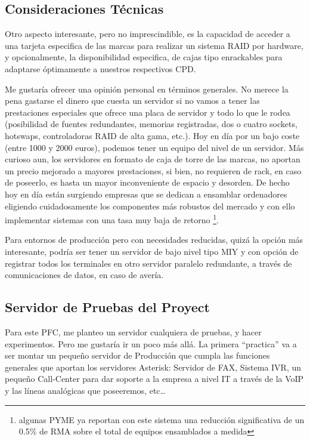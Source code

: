 \subsection{Consideraciones Técnicas}

Otro aspecto interesante, pero no imprescindible, es la capacidad de acceder a una tarjeta especifica de las marcas para realizar un sistema RAID por hardware, y opcionalmente, la disponibilidad especifica, de cajas tipo enrackables para adaptarse óptimamente a nuestros respectivos CPD.

Me gustaría ofrecer una opinión personal en términos generales. No merece la pena gastarse el dinero que cuesta un servidor si no vamos a tener las prestaciones especiales que ofrece una placa de servidor y todo lo que le rodea (posibilidad de fuentes redundantes, memorias registradas, dos o cuatro sockets, hotswaps, controladoras RAID de alta gama, etc.). Hoy en día por un bajo coste (entre 1000 y 2000 euros), podemos tener un equipo del nivel de un servidor. Más curioso aun, los servidores en formato de caja de torre de las marcas, no aportan un precio mejorado a mayores prestaciones, si bien, no requieren de rack, en caso de poseerlo, es hasta un mayor inconveniente de espacio y desorden. De hecho hoy en día están surgiendo empresas que se dedican a ensamblar ordenadores eligiendo cuidadosamente los componentes más robustos del mercado y con ello implementar sistemas con una tasa muy baja de retorno \footnote{algunas PYME ya reportan con este sistema una reducción significativa de un 0.5\% de RMA sobre el total de equipos ensamblados a medida}.

Para entornos de producción pero con necesidades reducidas, quizá la opción más interesante, podría ser  tener un servidor de bajo nivel tipo MIY y con opción de registrar todos los terminales en otro servidor paralelo redundante, a través de comunicaciones de datos, en caso de avería.

\subsection{Servidor de Pruebas del Proyect}

Para este PFC, me planteo un servidor cualquiera de pruebas, y hacer experimentos. Pero me gustaría ir un poco más allá. La primera “practica” va a ser montar un pequeño servidor de Producción que cumpla las funciones generales que aportan los servidores Asterisk: Servidor de FAX, Sistema IVR, un pequeño Call-Center para dar soporte a la empresa a nivel IT a través de la VoIP y las líneas analógicas que poseeremos, etc…

